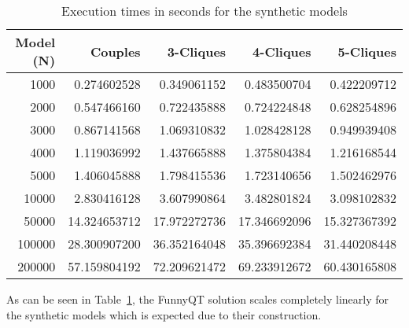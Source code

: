 \documentclass[a4paper]{article}
\begin{document}
\begin{table}
  \centering
  \begin{tabular}{| r | r | r | r | r |}
    \hline
    \textbf{Model (N)} & \textbf{Couples} & \textbf{3-Cliques} & \textbf{4-Cliques} & \textbf{5-Cliques}\\
    \hline
    1000   &    0.274602528  &  0.349061152  &  0.483500704  &  0.422209712\\
    2000   &    0.547466160  &  0.722435888  &  0.724224848  &  0.628254896\\
    3000   &    0.867141568  &  1.069310832  &  1.028428128  &  0.949939408\\
    4000   &    1.119036992  &  1.437665888  &  1.375804384  &  1.216168544\\
    5000   &    1.406045888  &  1.798415536  &  1.723140656  &  1.502462976\\
    10000  &    2.830416128  &  3.607990864  &  3.482801824  &  3.098102832\\
    50000  &    14.324653712 &  17.972272736 &  17.346692096 &  15.327367392\\
    100000 &    28.300907200 &  36.352164048 &  35.396692384 &  31.440208448\\
    200000 &    57.159804192 &  72.209621472 &  69.233912672 &  60.430165808\\
    \hline
  \end{tabular}
  \caption{Execution times in seconds for the synthetic models}
  \label{tab:bench-synth}
\end{table}

As can be seen in Table~\ref{tab:bench-synth}, the FunnyQT solution scales
completely linearly for the synthetic models which is expected due to their
construction.
\end{document}
